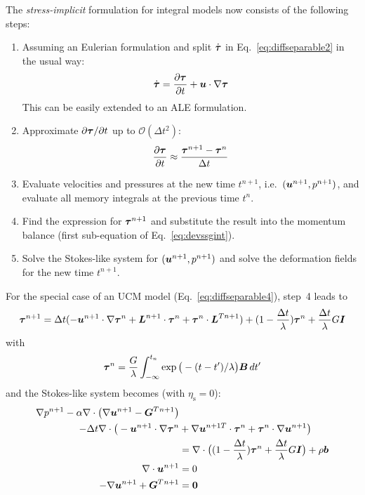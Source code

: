 \noindent The \emph{stress-implicit} formulation for integral models now consists of the following steps:
\begin{enumerate}
 \item Assuming an Eulerian formulation and split $\dot{\boldsymbol{\tau}}$ in Eq.~\eqref{eq:diffseparable2} in the usual way:
 \[
     \dot{\boldsymbol{\tau}}=\dfrac{\partial \boldsymbol{\tau}}{\partial t}+\boldsymbol{u}\cdot\nabla \boldsymbol{\tau}
 \]
 This can be easily extended to an ALE formulation.
 \item Approximate $\partial \boldsymbol{\tau}/\partial t$ up to $\mathcal{O}(\Delta t^2)$:
 \[
     \dfrac{\partial \boldsymbol{\tau}}{\partial t} \approx \frac{\boldsymbol{\tau}^{n+1}-\boldsymbol{\tau}^n}{\Delta t}
 \]
 \item Evaluate velocities and pressures at the new time $t^{n+1}$, i.e.\ $(\boldsymbol{u}^{n+1},p^{n+1})$, and evaluate all memory integrals at the previous time $t^n$.
 \item Find the expression for $\boldsymbol{\tau}^{n+1}$ and substitute the result into the momentum balance (first sub-equation of Eq.~\eqref{eq:devssgint}).
 \item Solve the Stokes-like system for $(\boldsymbol{u}^{n+1},p^{n+1})$ and solve the deformation fields for the new time $t^{n+1}$.

\end{enumerate}
For the special case of an UCM model (Eq.~\eqref{eq:diffseparable4}), step~4 leads to
\begin{equation}
  \boldsymbol{\tau}^{n+1} = \Delta t (-\boldsymbol{u}^{n+1}\cdot\nabla \boldsymbol{\tau}^n 
            +\boldsymbol{L}^{n+1}\cdot \boldsymbol{\tau}^n+\boldsymbol{\tau}^n \cdot\boldsymbol{L}^{Tn+1})+ 
            (1-\frac{\Delta t}\lambda)\boldsymbol{\tau}^n+\frac{\Delta t}\lambda G\boldsymbol{I}
  \label{eq:taunp1ucm}
\end{equation}
with
\begin{equation}
  \boldsymbol{\tau}^n=\frac{G}\lambda \int_{-\infty}^{t_n}\exp\big(-(t-t')/\lambda\big)\boldsymbol{B}\,dt'
  \label{eq:tauUCMn} 
\end{equation}
and the Stokes-like system becomes (with $\eta_\text{s}=0$):
\begin{equation}
\begin{split}
      \nabla p^{n+1} 
  -\alpha\nabla\cdot\big(\nabla\boldsymbol{u}^{n+1} -\boldsymbol{G}^T{}^{n+1} \big)&\\
-\Delta t\nabla\cdot\big(-\boldsymbol{u}^{n+1}\cdot\nabla \boldsymbol{\tau}^n &+\nabla\boldsymbol{u}^{n+1T}\cdot \boldsymbol{\tau}^n+\boldsymbol{\tau}^n \cdot\nabla\boldsymbol{u}^{n+1}\big) \\
        &=\nabla\cdot\big( (1-\frac{\Delta t}\lambda)\boldsymbol{\tau}^n+\frac{\Delta t}\lambda G\boldsymbol{I}  \big)+\rho\boldsymbol{b}\\
     \nabla\cdot\boldsymbol{u}^{n+1}&=0\\
   -\nabla\boldsymbol{u}^{n+1} + \boldsymbol{G}^T{}^{n+1} &= \boldsymbol{0}\label{eq:devssgint2}
\end{split}
\end{equation}
